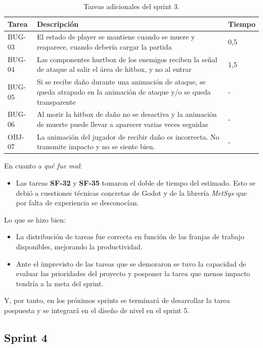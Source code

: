 \begin{table}[!ht]
    \centering
    \begin{tabular}{|l|p{8cm}|l|}
    \hline
        Tarea & Descripción & Tiempo \\ \hline
        BUG-03 & El estado de player se mantiene cuando se muere y reaparece, cuando debería cargar la partida & 0,5 \\ \hline
        BUG-04 & Las componentes hurtbox de los enemigos reciben la señal de ataque al salir el área de hitbox, y no al entrar & 1,5 \\ \hline
        BUG-05 & Si se recibe daño durante una animación de ataque, se queda atrapado en la animación de ataque y/o se queda transparente & - \\ \hline
        BUG-06 & Al morir la hitbox de daño no se desactiva y la animación de muerte puede llevar a aparecer varias veces seguidas & - \\ \hline
        OBJ-07 & La animación del jugador de recibir daño es incorrecta. No transmite impacto y no se siente bien. & - \\ \hline
    \end{tabular}
    \caption{Tareas adicionales del sprint 3.}
    \label{tab:aditionalsprint3task}
\end{table}

En cuanto a \textit{qué fue mal}:
\begin{itemize}
    \item Las tareas \textbf{SF-32} y \textbf{SF-35} tomaron el doble de tiempo del estimado. Esto se debió a cuestiones técnicas concretas de Godot y de la librería \textit{MetSys} que por falta de experiencia se desconocían.
\end{itemize}

Lo que se hizo bien:
\begin{itemize}
    \item La distribución de tareas fue correcta en función de las franjas de trabajo disponibles, mejorando la productividad.
    \item Ante el imprevisto de las tareas que se demoraron se tuvo la capacidad de evaluar las prioridades del proyecto y posponer la tarea que menos impacto tendría a la meta del sprint.
\end{itemize}

Y, por tanto, en los próximos sprints se terminará de desarrollar la tarea pospuesta y se integrará en el diseño de nivel en el sprint 5.


\subsection{Sprint 4}

